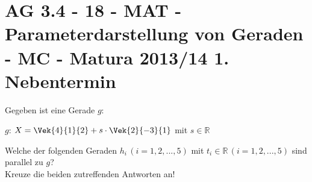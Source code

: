\section{AG 3.4 - 18 - MAT - Parameterdarstellung von Geraden - MC - Matura 2013/14 1. Nebentermin}

\begin{beispiel}[AG 3.4]{1} %
				Gegeben ist eine Gerade $g$:
				
				$g$: $X=\Vek{4}{1}{2}+s\cdot\Vek{2}{-3}{1}$ mit $s\in\mathbb{R}$
				
				Welche der folgenden Geraden $h_i\,(i=1,2,...,5)$ mit $t_i\in\mathbb{R}\,(i=1,2,...,5)$ sind parallel zu $g$?\\
				Kreuze die beiden zutreffenden Antworten an!\leer
				
\end{beispiel}